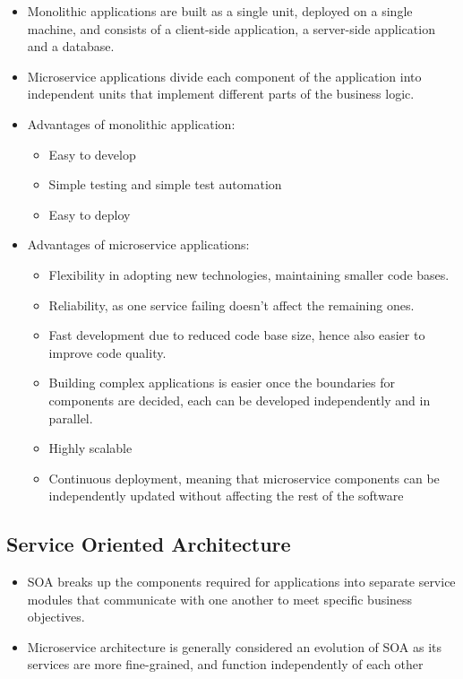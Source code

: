 \documentclass{article}
\begin{document}
\begin{itemize}
    \item Monolithic applications are built as a single unit, deployed on a single machine, and consists of a client-side application, a server-side application and a database.
    
    \item Microservice applications divide each component of the application into independent units that implement different parts of the business logic. 
    
    \item Advantages of monolithic application:
    \begin{itemize}
        \item Easy to develop 
        
        \item Simple testing and simple test automation 
        
        \item Easy to deploy 
    \end{itemize}
    
    \item Advantages of microservice applications:
    \begin{itemize}
        \item Flexibility in adopting new technologies, maintaining smaller code bases.
        
        \item Reliability, as one service failing doesn't affect the remaining ones. 
        
        \item Fast development due to reduced code base size, hence also easier to improve code quality.
        
        \item Building complex applications is easier once the boundaries for components are decided, each can be developed independently and in parallel.
        
        \item Highly scalable
        
        \item Continuous deployment, meaning that microservice components can be independently updated without affecting the rest of the software
    \end{itemize}
\end{itemize}

\subsection{Service Oriented Architecture}
\begin{itemize}
    \item SOA breaks up the components required for applications into separate service modules that communicate with one another to meet specific business objectives.
    
    \item  Microservice architecture is generally considered an evolution of SOA as its services are more fine-grained, and function independently of each other 
\end{itemize}
\end{document}
